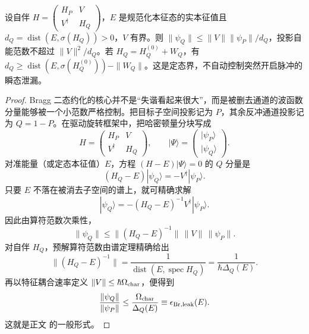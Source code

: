 \begin{lemma}[自伴分块本征态的谱隙泄漏界]
设自伴 $H=\left(\begin{smallmatrix}H_P&V\\V^\dagger&H_Q\end{smallmatrix}\right)$，$E$ 是规范化本征态的实本征值且 $d_Q=\operatorname{dist}(E,\sigma(H_Q))>0$，$V$ 有界。则 $\|\psi_Q\|\le\|V\|\|\psi_P\|/d_Q$，投影自能范数不超过 $\|V\|^2/d_Q$。若 $H_Q=H_Q^{(0)}+W_Q$，有 $d_Q\ge\operatorname{dist}(E,\sigma(H_Q^{(0)}))-\|W_Q\|$。这是定态界，不自动控制突然开启脉冲的瞬态泄漏。
\end{lemma}
\begin{proof}
Bragg 二态约化的核心并不是“失谐看起来很大”，而是被删去通道的波函数分量能够被一个小范数严格控制。把目标子空间投影记为 $P$，其余反冲通道投影记为 $Q=1-P$。在驱动旋转框架中，把哈密顿量分块写成
\begin{equation*}
H=
\begin{pmatrix}
H_P & V\\
V^\dagger & H_Q
\end{pmatrix},
\qquad
|\Psi\rangle=
\begin{pmatrix}|\psi_P\rangle\\|\psi_Q\rangle\end{pmatrix}.
\end{equation*}
对准能量（或定态本征值）$E$，方程 $(H-E)|\Psi\rangle=0$ 的 $Q$ 分量是
\begin{equation*}
(H_Q-E)|\psi_Q\rangle=-V^\dagger|\psi_P\rangle.
\end{equation*}
只要 $E$ 不落在被消去子空间的谱上，就可精确求解
\begin{equation*}
|\psi_Q\rangle
=-(H_Q-E)^{-1}V^\dagger|\psi_P\rangle.
\end{equation*}
因此由算符范数次乘性，
\begin{equation*}
\|\psi_Q\|
\le
\|(H_Q-E)^{-1}\|\,\|V\|\,\|\psi_P\|.
\end{equation*}
对自伴 $H_Q$，预解算符范数由谱定理精确给出
\begin{equation*}
\|(H_Q-E)^{-1}\|
=\frac1{\operatorname{dist}(E,\operatorname{spec}H_Q)}
=\frac1{\hbar\Delta_Q(E)}.
\end{equation*}
再以特征耦合速率定义 $\|V\|\le\hbar\Omega_{\rm char}$，便得到
\begin{equation*}
\frac{\|\psi_Q\|}{\|\psi_P\|}
\le
\frac{\Omega_{\rm char}}{\Delta_Q(E)}
\equiv\epsilon_{\rm Br,leak}(E).
\end{equation*}
这就是正文 的一般形式。


\end{proof}
